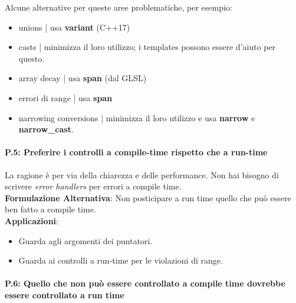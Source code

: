 \textsf{\small Alcune alternative per queste aree problematiche, per esempio: } \\

\begin{multicols}{2}
	\begin{itemize}
		\item \textsf{\small unions | usa \textbf{variant} (C++17)}
		\item \textsf{\small casts | minimizza il loro utilizzo; i templates possono essere d'aiuto per questo.}
		\item \textsf{\small array decay | usa \textbf{span} (dal GLSL)}
		\item \textsf{\small errori di range | usa \textbf{span}}
		\item \textsf{\small narrowing conversions | minimizza il loro utilizzo e usa \textbf{narrow} e \textbf{narrow\_cast}.}
	\end{itemize}
\end{multicols}

\paragraph{P.5: Preferire i controlli a compile-time rispetto che a run-time}

\textsf{\small La ragione è per via della chiarezza e delle performance. Non hai bisogno di scrivere \emph{error handlers} per errori a compile time.} \\

\textsf{\small \textbf{Formulazione Alternativa}: Non posticipare a run time quello che può essere ben fatto a compile time.} \\

\textsf{\small \textbf{Applicazioni}: }

\begin{itemize}
	\item \textsf{\small Guarda agli argomenti dei puntatori.}
	\item \textsf{\small Guarda ai controlli a run-time per le violazioni di range.}
\end{itemize}

\paragraph{P.6: Quello che non può essere controllato a compile time dovrebbe essere controllato a run time}

